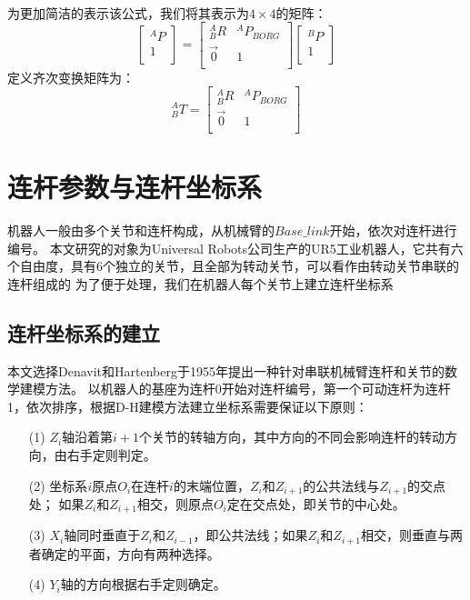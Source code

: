\documentclass{seuthesis-2022}
\numberwithin{equation}{section}
\begin{document}
\begin{itemize}
\begin{equation}
\begin{aligned}
  \end{aligned}
  \end{equation}
  为更加简洁的表示该公式，我们将其表示为$4 \times 4$的矩阵：
  \begin{equation}
  \begin{bmatrix}
    ^{A}P\\
    1\\
  \end{bmatrix}
  =
  \begin{bmatrix}
    ^{A}_{B}R & ^{A}P_{BORG}\\
    \vec{0} & 1\\
  \end{bmatrix}
  \begin{bmatrix}
    ^{B}P\\
    1\\
  \end{bmatrix}
  \end{equation}
  定义齐次变换矩阵为：
  \begin{equation}\label{eq:1}
  ^{A}_{B}T =
  \begin{bmatrix}
    ^{A}_{B}R & ^{A}P_{BORG}\\
    \vec{0} & 1\\
  \end{bmatrix}
  \end{equation}
\end{itemize}


\section{连杆参数与连杆坐标系}
机器人一般由多个关节和连杆构成，从机械臂的$Base\_link$开始，依次对连杆进行编号。
本文研究的对象为Universal Robots公司生产的UR5工业机器人，它共有六个自由度，具有6个独立的关节，且全部为转动关节，可以看作由转动关节串联的连杆组成的
为了便于处理，我们在机器人每个关节上建立连杆坐标系

\subsection{连杆坐标系的建立}
本文选择Denavit和Hartenberg于1955年提出一种针对串联机械臂连杆和关节的数学建模方法\cite{1955A}。
以机器人的基座为连杆0开始对连杆编号，第一个可动连杆为连杆1，依次排序，根据D-H建模方法建立坐标系需要保证以下原则：
\begin{itemize}
  \item[(1)]
  $Z_i$轴沿着第$i+1$个关节的转轴方向，其中方向的不同会影响连杆的转动方向，由右手定则判定。
  \item[(2)]
  坐标系$i$原点$O_i$在连杆$i$的末端位置，$Z_i$和$Z_{i+1}$的公共法线与$Z_{i+1}$的交点处；
  如果$Z_i$和$Z_{i+1}$相交，则原点$O_i$定在交点处，即关节的中心处。
  \item[(3)]
  $X_i$轴同时垂直于$Z_i$和$Z_{i-1}$，即公共法线；如果$Z_i$和$Z_{i+1}$相交，则垂直与两者确定的平面，方向有两种选择。
  \item[(4)]  
  $Y_i$轴的方向根据右手定则确定。
\end{itemize}
\end{document}
